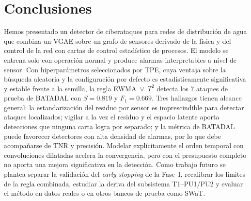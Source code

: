 \documentclass[11pt,a4paper]{article}
\begin{document}
\section{Conclusiones}

Hemos presentado un detector de ciberataques para redes de distribución de agua que
combina un VGAE sobre un grafo de sensores derivado de la física y del control de la
red con cartas de control estadístico de procesos. El modelo se entrena solo con
operación normal y produce alarmas interpretables a nivel de sensor. Con
hiperparámetros seleccionados por TPE, cuya ventaja sobre la búsqueda aleatoria y la
configuración por defecto es estadísticamente significativa y estable frente a la
semilla, la regla EWMA~$\vee$~$T^2$ detecta los 7 ataques de prueba de BATADAL con
$S=0.819$ y $F_1=0.669$. Tres hallazgos tienen alcance general: la estandarización del
residuo por sensor es imprescindible para detectar ataques localizados; vigilar a la
vez el residuo y el espacio latente aporta detecciones que ninguna carta logra por
separado; y la métrica de BATADAL puede favorecer detectores con alta densidad de
alarmas, por lo que debe acompañarse de TNR y precisión. Modelar explícitamente el
orden temporal con convoluciones dilatadas acelera la convergencia, pero con el
presupuesto completo no aporta una mejora significativa en la detección. Como trabajo
futuro se plantea separar la validación del \emph{early stopping} de la Fase~I, recalibrar los
límites de la regla combinada, estudiar la deriva del subsistema T1--PU1/PU2 y evaluar
el método en datos reales o en otros bancos de prueba como SWaT.
\end{document}
